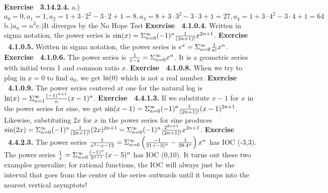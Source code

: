  {\noindent \protect \bf  Exercise ~3.14.2.4.} a.)$a_0 = 0, a_1=1, a_2=1+3\cdot 2^2-3\cdot 2+1 = 8, a_3=8+3\cdot 3^2-3\cdot 3+1 = 27, a_4=1+3\cdot 4^2-3\cdot 4+1 = 64 $\protect \newline  b.)$a_n = n^3$\protect \newline  c.)It diverges by the No Hope Test  \protect \newline  \protect \newline  
 {\noindent \protect \bf  Exercise ~4.1.0.4.} Written in sigma notation, the power series is $\protect \qopname  \relax o{sin}(x)=\Sigma _{n=0}^\infty (-1)^{n}\protect \frac  {1}{\left (2n+1\right )!}x^{2n+1}$. \protect \newline  \protect \newline  
 {\noindent \protect \bf  Exercise ~4.1.0.5.} Written in sigma notation, the power series is $e^x=\Sigma _{n=0}^\infty \protect \frac  {1}{n!}x^{n}$. \protect \newline  \protect \newline  
 {\noindent \protect \bf  Exercise ~4.1.0.6.} The power series is $\protect \frac  {1}{1-x}=\Sigma _{n=0}^\infty x^n$. It is a geometric series with initial term 1 and common ratio $x$. \protect \newline  \protect \newline  
 {\noindent \protect \bf  Exercise ~4.1.0.8.} When we try to plug in $x=0$ to find $a_0$, we get $\protect \qopname  \relax o{ln}(0)$ which is not a real number. \protect \newline  \protect \newline  
 {\noindent \protect \bf  Exercise ~4.1.0.9.} The power series centered at one for the natural log is $\protect \qopname  \relax o{ln}(x)=\Sigma _{n=1}^\infty \protect \frac  {(-1)^{n+1}}{n}(x-1)^n$. \protect \newline  \protect \newline  
 {\noindent \protect \bf  Exercise ~4.4.1.3.} If we substitute $x-1$ for $x$ in the power series for sine, we get $\protect \qopname  \relax o{sin}(x-1)=\Sigma _{n=0}^\infty (-1)^{n}\protect \frac  {1}{\left (2n+1\right )!}(x-1)^{2n+1}$. Likewise, substituting $2x$ for $x$ in the power series for sine produces $\protect \qopname  \relax o{sin}(2x)=\Sigma _{n=0}^\infty (-1)^{n}\protect \frac  {1}{\left (2n+1\right )!}(2x)^{2n+1}=\Sigma _{n=0}^\infty (-1)^{n}\protect \frac  {2^{2n+1}}{\left (2n+1\right )!}x^{2n+1}$. \protect \newline  \protect \newline  
 {\noindent \protect \bf  Exercise ~4.4.2.3.} The power series $\protect \frac  {1}{x^2-x-12}=\Sigma _{n=0}^\infty \left (\protect \frac  {-1}{21\cdot (-3)^n}-\protect \frac  {1}{28\cdot 4^n}\right )x^n$ has IOC (-3,3). The power series $\protect \frac  {1}{x}=\Sigma _{n=0}^\infty \protect \frac  {(-1)^n}{5^{n+1}}(x-5)^n$ has IOC (0,10). It turns out these two examples generalize; for rational functions, the IOC will always just be the interval that goes from the center of the series outwards until it bumps into the nearest vertical asymptote! \protect \newline  \protect \newline  
